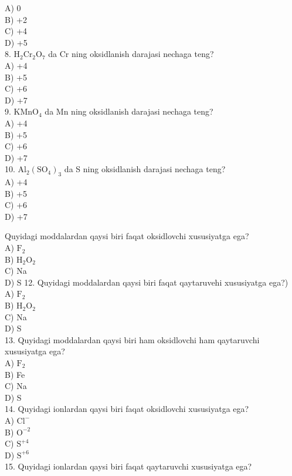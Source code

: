 A) 0\\
B) +2\\
C) +4\\
D) +5\\
8. $\mathrm{H}_{2} \mathrm{Cr}_{2} \mathrm{O}_{7}$ da Cr ning oksidlanish darajasi nechaga teng?\\
A) +4\\
B) +5\\
C) +6\\
D) +7\\
9. $\mathrm{KMnO}_{4}$ da Mn ning oksidlanish darajasi nechaga teng?\\
A) +4\\
B) +5\\
C) +6\\
D) +7\\
10. $\mathrm{Al}_{2}\left(\mathrm{SO}_{4}\right)_{3}$ da S ning oksidlanish darajasi nechaga teng?\\
A) +4\\
B) +5\\
C) +6\\
D) +7
  \item Quyidagi moddalardan qaysi biri faqat oksidlovchi xususiyatga ega?\\
A) $\mathrm{F}_{2}$\\
B) $\mathrm{H}_{2} \mathrm{O}_{2}$\\
C) Na\\
D) S
12. Quyidagi moddalardan qaysi biri faqat qaytaruvehi xususiyatga ega?)\\
A) $\mathrm{F}_{2}$\\
B) $\mathrm{H}_{2} \mathrm{O}_{2}$\\
C) Na\\
D) S\\
13. Quyidagi moddalardan qaysi biri ham oksidlovchi ham qaytaruvchi xususiyatga ega?\\
A) $\mathrm{F}_{2}$\\
B) Fe\\
C) Na\\
D) S\\
14. Quyidagi ionlardan qaysi biri faqat oksidlovchi xususiyatga ega?\\
A) $\mathrm{Cl}^{-}$\\
B) $\mathrm{O}^{-2}$\\
C) $\mathrm{S}^{+4}$\\
D) $\mathrm{S}^{+6}$\\
15. Quyidagi ionlardan qaysi biri faqat qaytaruvchi xususiyatga ega?\\
